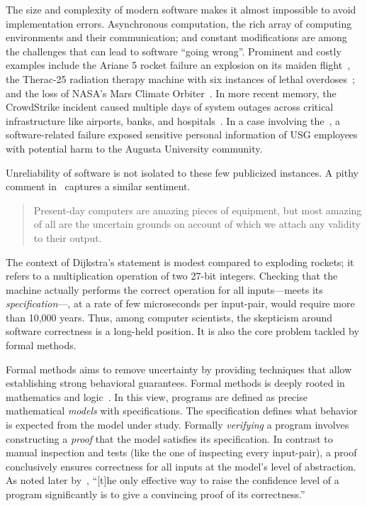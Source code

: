 The size and complexity of modern software makes it almost impossible to avoid implementation errors.
Asynchronous computation, the rich array of computing environments and their communication;
and constant modifications are among the challenges that can lead to software \enquote{going wrong}.
Prominent and costly examples include
the Ariane 5 rocket failure an explosion on its maiden flight~\cite{ariane5},
the Therac-25 radiation therapy machine with six instances of lethal overdoses~\cite{leveson1993};
and the loss of NASA's Mars Climate Orbiter~\cite{mars1999}.
In more recent memory, the CrowdStrike incident caused multiple days of system outages
 across critical infrastructure like airports, banks, and hospitals~\cite{crowdstrike}.
In a case involving the~\textcite{usg2024},
a software-related failure exposed sensitive personal information of USG employees with potential harm to the Augusta University community.

Unreliability of software is not isolated to these few publicized instances.
A pithy comment in~\textcite[p. 3]{wdijkstra1970} captures a similar sentiment.

\begin{quotation}
\noindent{}Present-day computers are amazing pieces of equipment,
but most amazing of all are the uncertain grounds on account of which we attach any validity to their output.
\end{quotation}

The context of Dijkstra's statement is modest compared to exploding rockets;
it refers to a multiplication operation of two 27-bit integers.
Checking that the machine actually performs the correct operation for all inputs---\ie meets its \emph{specification}---,
at a rate of few microseconds per input-pair, would require more than 10,000 years.
Thus, among computer scientists, the skepticism around software correctness is a long-held position.
It is also the core problem tackled by formal methods.

Formal methods aims to remove uncertainty by providing techniques that allow establishing strong behavioral guarantees.
Formal methods is deeply rooted in mathematics and logic~\cite{shankar2023}.
In this view, programs are defined as precise mathematical \emph{models} with {specifications}.
The specification defines what behavior is expected from the model under study.
Formally \emph{verifying} a program involves constructing a \emph{proof} that the model satisfies its specification.
In contrast to manual inspection and tests (like the one of inspecting every input-pair),
a proof conclusively ensures correctness for all inputs at the model's level of abstraction.
As noted later by~\textcite{dijkstra1972}, \enquote{{[t]he only effective way to raise the confidence level of a program significantly is to give a convincing proof of its correctness.}}

